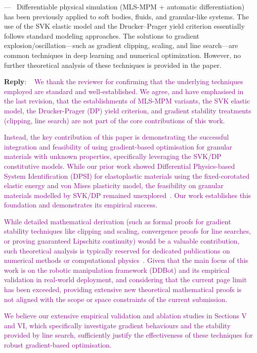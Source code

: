 \documentclass[11pt]{article}
\newcounter{reviewer}
\newcounter{point}[reviewer]
\renewcommand{\thepoint}{P\,\thereviewer.\arabic{point}}
\newenvironment{point}
   {\refstepcounter{point} \bigskip \noindent {\textbf{Reviewer~Point~\thepoint} } ---\ }
   {\par }
\newenvironment{reply}
   {\medskip \noindent \begin{sf}\textbf{Reply}: \  }
   {\medskip \end{sf}}
\newcommand{\rp}[1]{\textcolor{purple}{#1}}
\begin{document}
\begin{point}
Differentiable physical simulation (MLS-MPM + automatic
differentiation) has been previously applied to soft bodies, fluids,
and granular-like systems. The use of the SVK elastic model and the
Drucker–Prager yield criterion essentially follows standard modeling
approaches. The solutions to gradient explosion/oscillation—such as
gradient clipping, scaling, and line search—are common techniques in
deep learning and numerical optimization. However, no further
theoretical analysis of these techniques is provided in the paper.
\end{point}

\begin{reply}
\rp{We thank the reviewer for confirming that the underlying techniques employed are standard and well-established. We agree, and have emphasised in the last revision, that the establishments of MLS-MPM variants, the SVK elastic model, the Drucker-Prager (DP) yield criterion, and gradient stability treatments (clipping, line search) are not part of the core contributions of this work.}

\rp{Instead, the key contribution of this paper is demonstrating the successful integration and feasibility of using gradient-based optimisation for granular materials with unknown properties, specifically leveraging the SVK/DP constitutive models. While our prior work showed Differential Physics-based System Identification (DPSI) for elastoplastic materials using the fixed-corotated elastic energy and von Mises plasticity model, the feasibility on granular materials modelled by SVK/DP remained unexplored~\cite{xy2024sysid}. Our work establishes this foundation and demonstrates its empirical success.}

\rp{While detailed mathematical derivation (such as formal proofs for gradient stability techniques like clipping and scaling, convergence proofs for line searches, or proving guaranteed Lipschitz continuity) would be a valuable contribution, such theoretical analysis is typically reserved for dedicated publications on numerical methods or computational physics~\cite{nocedal2006numerical, mai2021stability}. Given that the main focus of this work is on the robotic manipulation framework (DDBot) and its empirical validation in real-world deployment, and considering that the current page limit has been exceeded, providing extensive new theoretical mathematical proofs is not aligned with the scope or space constraints of the current submission.}

\rp{We believe our extensive empirical validation and ablation studies in Sections V and VI, which specifically investigate gradient behaviours and the stability provided by line search, sufficiently justify the effectiveness of these techniques for robust gradient-based optimisation.}

\end{reply}
\end{document}
